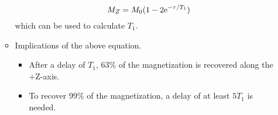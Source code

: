 \documentclass[../notes.tex]{subfiles}
\begin{document}
\begin{itemize}
\begin{itemize}
\begin{equation*}
            M_Z = M_0(1-2\e[-\tau/T_1])
        \end{equation*}
        which can be used to calculate $T_1$.
        \item Implications of the above equation.
        \begin{itemize}
            \item After a delay of $T_1$, 63\% of the magnetization is recovered along the +Z-axis.
            \item To recover 99\% of the magnetization, a delay of at least $5T_1$ is needed.
        \end{itemize}
    \end{itemize}
\end{itemize}
\end{document}
